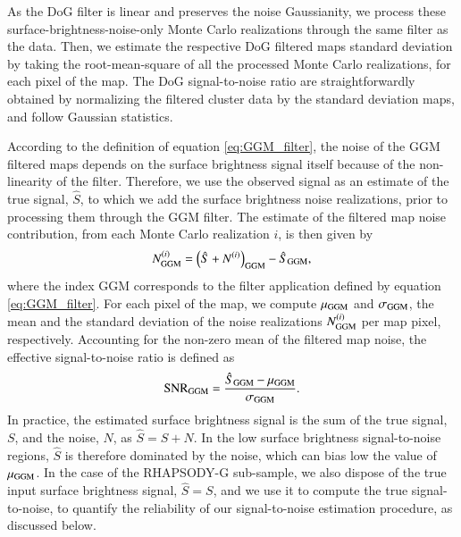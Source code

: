 \documentclass[twocolumn,traditabstract]{aa}
\begin{document}
As the DoG filter is linear and preserves the noise Gaussianity, we process these surface-brightness-noise-only Monte Carlo realizations through the same filter as the data. Then, we estimate the respective DoG filtered maps standard deviation by taking the root-mean-square of all the processed Monte Carlo realizations, for each pixel of the map. The DoG signal-to-noise ratio are straightforwardly obtained by normalizing the filtered cluster data by the standard deviation maps, and follow Gaussian statistics.

According to the definition of equation \ref{eq:GGM_filter}, the noise of the GGM filtered maps depends on the surface brightness signal itself because of the non-linearity of the filter. Therefore, we use the observed signal as an estimate of the true signal, $\hat{S}$, to which we add the surface brightness noise realizations, prior to processing them through the GGM filter. The estimate of the filtered map noise contribution, from each Monte Carlo realization $i$, is then given by
\begin{equation}
	N^{(i)}_{\rm GGM} = \left(\hat{S} + N^{(i)}\right)_{\rm GGM} -  \hat{S}_{\rm GGM},
	\label{eq:GGM_filter_noise}
\end{equation}
where the index GGM corresponds to the filter application defined by equation \ref{eq:GGM_filter}. For each pixel of the map, we compute $\mu_{\rm GGM}$ and $\sigma_{\rm GGM}$, the mean and the standard deviation of the noise realizations $N^{(i)}_{\rm GGM}$ per map pixel, respectively. Accounting for the non-zero mean of the filtered map noise, the effective signal-to-noise ratio is defined as 
\begin{equation}
{\rm SNR}_{\rm GGM} = \frac{\hat{S}_{\rm GGM} - \mu_{\rm GGM}}{\sigma_{\rm GGM}}.
	\label{eq:GGM_filter_snr}
\end{equation}
In practice, the estimated surface brightness signal is the sum of the true signal, $S$, and the noise, $N$, as $\hat{S} = S + N$. In the low surface brightness signal-to-noise regions, $\hat{S}$ is therefore dominated by the noise, which can bias low the value of $\mu_{\rm GGM}$. In the case of the RHAPSODY-G sub-sample, we also dispose of the true input surface brightness signal, $\hat{S} = S$, and we use it to compute the true signal-to-noise, to quantify the reliability of our signal-to-noise estimation procedure, as discussed below.
\end{document}
